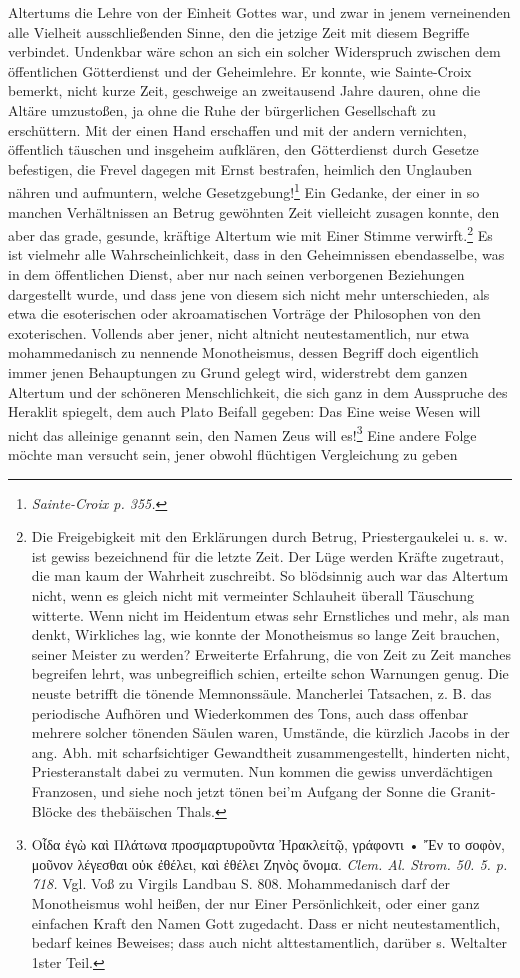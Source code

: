 \documentclass[a4paper, 11pt, oneside]{article}
\begin{document}
Altertums die Lehre von der Einheit Gottes war, und zwar in jenem verneinenden alle Vielheit ausschließenden Sinne, den die jetzige Zeit mit diesem Begriffe verbindet. Undenkbar wäre schon an sich ein solcher Widerspruch zwischen dem öffentlichen Götterdienst und der Geheimlehre. Er konnte, wie Sainte-Croix bemerkt, nicht kurze Zeit, geschweige an zweitausend Jahre dauren, ohne die Altäre umzustoßen, ja ohne die Ruhe der bürgerlichen Gesellschaft zu erschüttern. Mit der einen Hand erschaffen und mit der andern vernichten, öffentlich täuschen und insgeheim aufklären, den Götterdienst durch Gesetze befestigen, die Frevel dagegen mit Ernst bestrafen, heimlich den Unglauben nähren und aufmuntern, welche Gesetzgebung!\footnote{\emph{Sainte-Croix p. 355.}} Ein Gedanke, der einer in so manchen Verhältnissen an Betrug gewöhnten Zeit vielleicht zusagen konnte, den aber das grade, gesunde, kräftige Altertum wie mit Einer Stimme verwirft.\footnote{Die Freigebigkeit mit den Erklärungen durch Betrug, Priestergaukelei u. s. w. ist gewiss bezeichnend für die letzte Zeit. Der Lüge werden Kräfte zugetraut, die man kaum der Wahrheit zuschreibt. So blödsinnig auch war das Altertum nicht, wenn es gleich nicht mit vermeinter Schlauheit überall Täuschung witterte. Wenn nicht im Heidentum etwas sehr Ernstliches und mehr, als man denkt, Wirkliches lag, wie konnte der Monotheismus so lange Zeit brauchen, seiner Meister zu werden? Erweiterte Erfahrung, die von Zeit zu Zeit manches begreifen lehrt, was unbegreiflich schien, erteilte schon Warnungen genug. Die neuste betrifft die tönende Memnonssäule. Mancherlei Tatsachen, z. B. das periodische Aufhören und Wiederkommen des Tons, auch dass offenbar mehrere solcher tönenden Säulen waren, Umstände, die kürzlich Jacobs in der ang. Abh. mit scharfsichtiger Gewandtheit zusammengestellt, hinderten nicht, Priesteranstalt dabei zu vermuten. Nun kommen die gewiss unverdächtigen Franzosen, und siehe noch jetzt tönen bei'm Aufgang der Sonne die Granit-Blöcke des thebäischen Thals.} Es ist vielmehr alle Wahrscheinlichkeit, dass in den Geheimnissen ebendasselbe, was in dem öffentlichen Dienst, aber nur nach seinen verborgenen Beziehungen dargestellt wurde, und dass jene von diesem sich nicht mehr unterschieden, als etwa die esoterischen oder akroamatischen Vorträge der Philosophen von den exoterischen. Vollends aber jener, nicht altnicht neutestamentlich, nur etwa mohammedanisch zu nennende Monotheismus, dessen Begriff doch eigentlich immer jenen Behauptungen zu Grund gelegt wird, widerstrebt dem ganzen Altertum und der schöneren Menschlichkeit, die sich ganz in dem Ausspruche des Heraklit spiegelt, dem auch Plato Beifall gegeben: Das Eine weise Wesen will nicht das alleinige genannt sein, den Namen Zeus will es!\footnote{Οἶδα ἐγὼ καὶ Πλάτωνα προσμαρτυροῦντα Ἠρακλείτῷ, γράφοντι • Ἔν το σοφὸν, μοῦνον λέγεσθαι οὐκ ἐθέλει, καὶ ἐθέλει Ζηνὸς ὄνομα. \emph{Clem. Al. Strom. 50. 5. p. 718.} Vgl. Voß zu Virgils Landbau S. 808. Mohammedanisch darf der Monotheismus wohl heißen, der nur Einer Persönlichkeit, oder einer ganz einfachen Kraft den Namen Gott zugedacht. Dass er nicht neutestamentlich, bedarf keines Beweises; dass auch nicht alttestamentlich, darüber s. Weltalter 1ster Teil.} Eine andere Folge möchte man versucht sein, jener obwohl flüchtigen Vergleichung zu geben 
\end{document}
